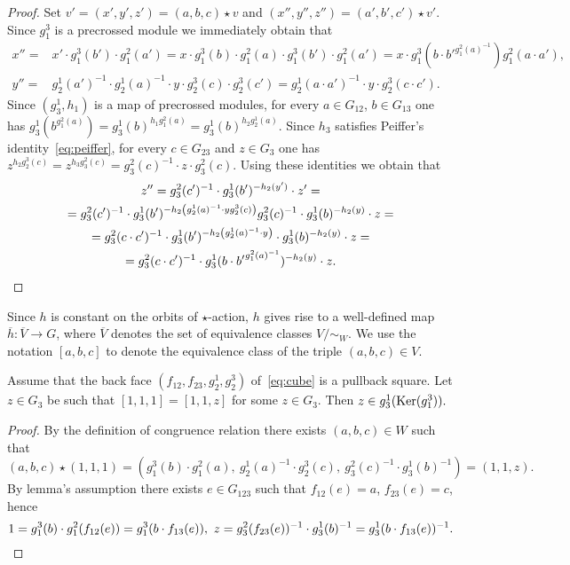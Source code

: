 \begin{proof}
    Set $v'=(x', y', z') = (a, b, c) \star v$ and $(x'', y'', z'') = (a', b', c') \star v'$.
    Since $g_1^3$ is a precrossed module we immediately obtain that
    \begin{align*}
        x'' =& x' \cdot g_1^3(b') \cdot g_1^2(a') = x \cdot g_1^3(b) \cdot g_1^2(a) \cdot g_1^3(b') \cdot g_1^2(a') = x \cdot g_1^3(b \cdot b'^{g_1^2(a)^{-1}}) g_1^2(a \cdot a'),\\
        y'' =& g_2^1(a')^{-1} \cdot g_2^1(a)^{-1} \cdot y \cdot g_2^3(c) \cdot g_2^3(c') = g_2^1(a\cdot a')^{-1} \cdot y \cdot g_2^{3}(c\cdot c'). \end{align*}
    Since $(g_3^1, h_1)$ is a map of precrossed modules, for every $a \in G_{12}$, $b \in G_{13}$ one has $g_3^1(b^{g_1^2(a)}) = g_3^1(b)^{h_1 g_1^2(a)} = g_3^1(b)^{h_2g_2^1(a)}$.
    Since $h_3$ satisfies Peiffer's identity~\eqref{eq:peiffer}, for every $c \in G_{23}$ and $z \in G_3$ one has $z ^{h_2 g_2^3(c)} = z^{ h_3 g_3^2(c)} = g_3^2(c)^{-1} \cdot z \cdot g_3^2(c)$.
    Using these identities we obtain that
    \begin{multline*}
        z'' = g_3^2(c')^{-1} \cdot g_3^1(b')^{-h_2(y')} \cdot z' = \\
        = g_3^2(c')^{-1} \cdot g_3^1(b')^{- h_2 \left( g_2^1(a)^{-1} \cdot y g_2^3(c) \right)} g_3^2(c)^{-1} \cdot g_3^1(b)^{-h_2(y)} \cdot z = \\
        = g_3^2(c \cdot c')^{-1} \cdot g_3^1(b')^{- h_2 \left( g_2^1(a)^{-1} \cdot y \right)} \cdot g_3^1(b)^{-h_2(y)} \cdot z = \\
        = g_3^2(c \cdot c')^{-1} \cdot g_3^1(b \cdot {b'} ^ {g_1^2(a)^{-1}})^{- h_2 \left( y \right)} \cdot z. \qedhere
    \end{multline*}
\end{proof}
Since $h$ is constant on the orbits of $\star$-action, $h$ gives rise to a well-defined map $\overline{h} \colon \overline{V} \to G$,
 where $\overline{V}$ denotes the set of equivalence classes $V/\sim_W.$
We use the notation $[a, b, c]$ to denote the equivalence class of the triple $(a, b, c) \in V$.

\begin{lemma}\label{lem:one-one-z} Assume that the back face $(f_{12}, f_{23}, g_2^1, g_2^3)$ of~\eqref{eq:cube} is a pullback square.
Let $z \in G_3$ be such that $[1, 1, 1] = [1, 1, z]$ for some $z\in G_3$.
Then $z \in g_3^1(\operatorname{Ker}(g_1^3)).$ \end{lemma}
\begin{proof} By the definition of congruence relation there exists $(a, b, c)\in W$ such that
\[ (a, b, c) \star (1, 1, 1) = ( g_1^3(b) \cdot g_1^2(a),\ g_2^1(a)^{-1} \cdot g_2^3(c),\ g_3^2(c)^{-1} \cdot g_3^1(b)^{-1}) = (1,1,z). \]
By lemma's assumption there exists $e \in G_{123}$ such that $f_{12}(e) = a$, $f_{23}(e) = c$, hence
\[ 1 = g_1^3(b) \cdot g_1^2(f_{12}(e)) = g_1^3(b \cdot f_{13}(e)),\ z = g_3^2(f_{23}(e))^{-1} \cdot g_3^1(b)^{-1} = g_3^1(b \cdot f_{13}(e))^{-1}. \qedhere\] \end{proof}


